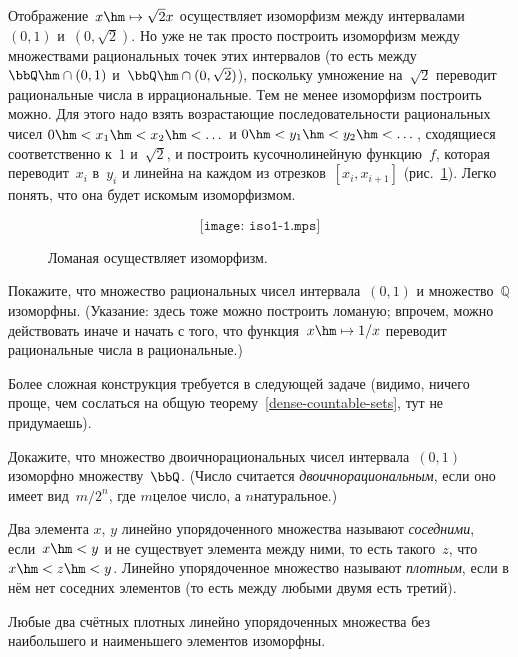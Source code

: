 Отображение~$x\hm\mapsto \sqrt{2}x$ осуществляет изоморфизм между
интервалами~$(0,1)$ и~$(0,\sqrt{2})$.
Но уже не так просто построить изоморфизм между
множествами рациональных точек этих интервалов (то есть
между~$\bbQ\hm\cap(0,1)$ и~$\bbQ\hm\cap(0,\sqrt{2})$), поскольку
умножение на~$\sqrt{2}$ переводит рациональные числа в
иррациональные. Тем не менее изоморфизм построить можно. Для
этого надо взять возрастающие последовательности рациональных чисел
$0\hm<x_1\hm<x_2\hm<\dots$ и $0\hm< y_1\hm<y_2\hm<\dots$, сходящиеся
соответственно к~$1$ и~$\sqrt{2}$, и построить кусочно\д линейную
функцию~$f$, которая переводит~$x_i$ в~$y_i$ и линейна на каждом
из отрезков~$[x_i,x_{i+1}]$ (рис.~\ref{iso-1}).
Легко понять, что она будет искомым
изоморфизмом.
\begin{figure}[ht]
$$
\texttt{[image: iso1-1.mps]}
$$
\caption{Ломаная осуществляет изоморфизм.}
\label{iso-1}
\end{figure}

\begin{problem}
Покажите, что множество рациональных чисел интервала~$(0,1)$ и
множество~$\mathbb{Q}$ изоморфны. (Указание: здесь тоже можно
построить ломаную; впрочем, можно действовать иначе и начать с
того, что функция~$x\hm\mapsto 1/x$ переводит рациональные числа
в рациональные.)
\end{problem}

\problskip
Более сложная конструкция требуется в следующей
задаче (видимо, ничего проще, чем сослаться на общую
теорему~\ref{dense-countable-sets}, тут не придумаешь).


\begin{problem}
Докажите, что множество двоично\д рациональных чисел%
 интервала~$(0,1)$
изоморфно множеству~$\bbQ$. (Число считается
\emph{двоично\д рациональным}, если оно имеет вид~$m/2^n$, где
$m$\т целое число, а $n$\т натуральное.)
\end{problem}

\problskip
Два элемента $x$, $y$ линейно упорядоченного множества называют
\emph{соседними}, если~$x\hm<y$ и не
существует элемента между
ними, то есть такого~$z$, что~$x\hm<z\hm<y$. Линейно упорядоченное
множество называют \emph{плотным},
если в нём нет соседних
элементов (то есть между любыми двумя есть третий).

\begin{theorem}\label{dense-countable-sets}
Любые два счётных плотных линейно упорядоченных множества без
наибольшего и наименьшего элементов изоморфны.
\end{theorem}

